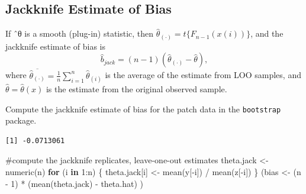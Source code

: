 \documentclass[
  letterpaper,
  DIV=11,
  numbers=noendperiod]{scrreprt}
\newenvironment{Shaded}{\begin{snugshade}}{\end{snugshade}}
\newcommand{\AttributeTok}[1]{\textcolor[rgb]{0.40,0.45,0.13}{#1}}
\newcommand{\CommentTok}[1]{\textcolor[rgb]{0.37,0.37,0.37}{#1}}
\newcommand{\ControlFlowTok}[1]{\textcolor[rgb]{0.00,0.23,0.31}{\textbf{#1}}}
\newcommand{\DecValTok}[1]{\textcolor[rgb]{0.68,0.00,0.00}{#1}}
\newcommand{\FunctionTok}[1]{\textcolor[rgb]{0.28,0.35,0.67}{#1}}
\newcommand{\NormalTok}[1]{\textcolor[rgb]{0.00,0.23,0.31}{#1}}
\newcommand{\OtherTok}[1]{\textcolor[rgb]{0.00,0.23,0.31}{#1}}
\newcommand{\SpecialCharTok}[1]{\textcolor[rgb]{0.37,0.37,0.37}{#1}}
\newcommand{\StringTok}[1]{\textcolor[rgb]{0.13,0.47,0.30}{#1}}
\begin{document}
\subsection{Jackknife Estimate of
Bias}\label{jackknife-estimate-of-bias}

If ˆθ is a smooth (plug-in) statistic, then
\(\hat \theta_{(\cdot)} = t\{F_{n−1}(x(i))\}\), and the jackknife
estimate of bias is \[
\hat{b}_{jack} = (n − 1)(\hat \theta_{(\cdot)} − \hat \theta), 
\] where
\(\overline{\hat \theta_{(\cdot)}}=\frac{1}{n} \sum_{i=1}^n \hat \theta_{(i)}\)
is the average of the estimate from LOO samples, and
\(\hat \theta=\hat \theta(x)\) is the estimate from the original
observed sample.

Compute the jackknife estimate of bias for the patch data in the
\texttt{bootstrap} package.

\begin{Shaded}
\end{Shaded}

\begin{verbatim}
[1] -0.0713061
\end{verbatim}

\begin{Shaded}
\begin{Highlighting}[]
\CommentTok{\#compute the jackknife replicates, leave{-}one{-}out estimates}
\NormalTok{theta.jack }\OtherTok{\textless{}{-}} \FunctionTok{numeric}\NormalTok{(n)}
\ControlFlowTok{for}\NormalTok{ (i }\ControlFlowTok{in} \DecValTok{1}\SpecialCharTok{:}\NormalTok{n) \{}
\NormalTok{  theta.jack[i] }\OtherTok{\textless{}{-}} \FunctionTok{mean}\NormalTok{(y[}\SpecialCharTok{{-}}\NormalTok{i]) }\SpecialCharTok{/} \FunctionTok{mean}\NormalTok{(z[}\SpecialCharTok{{-}}\NormalTok{i])}
\NormalTok{\}}
\NormalTok{(bias }\OtherTok{\textless{}{-}}\NormalTok{ (n }\SpecialCharTok{{-}} \DecValTok{1}\NormalTok{) }\SpecialCharTok{*}\NormalTok{ (}\FunctionTok{mean}\NormalTok{(theta.jack) }\SpecialCharTok{{-}}\NormalTok{ theta.hat) )}
\end{Highlighting}
\end{Shaded}
\end{document}
